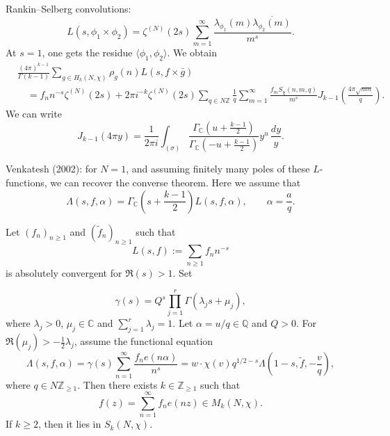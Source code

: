 \documentclass[reqno]{amsart} 
\begin{document}
Rankin--Selberg convolutions:
\begin{equation*}
  L (s, \phi_1 \times \phi_2 ) = \zeta^{(N)} (2 s )
  \sum_{m = 1 }^\infty
  \frac{\lambda_{\phi_1 } (m) \overline{\lambda_{\phi_2 } (m)}}{ m^s}.
\end{equation*}
At $s=1$, one gets the residue $\langle \phi_1, \phi_2 \rangle$.  We obtain
\begin{align*}
  &\frac{(4 \pi )^{k - 1}}{\Gamma (k - 1 )}
  \sum_{g \in H_k (N, \chi )}
  \rho_g (n) L (s, f \times \bar{g}) \\
  &\quad =
    f_n n^{- s}
    \zeta^{(N)} (2 s ) + 2 \pi i^{- k}
    \zeta^{(N)} (2 s)
    \sum_{q \in N \mathbb{Z} }
    \frac{1}{q}
    \sum_{m = 1}^\infty \frac{f_m S_\chi (n, m, q)}{m^s }
    J_{k - 1 } \left( \frac{4 \pi \sqrt{m n }}{q} \right).
\end{align*}
We can write
\begin{equation*}
  J_{k - 1 } (4 \pi y)
  = \frac{1}{2 \pi i }
  \int_{(\sigma)}
  \frac{\Gamma_{\mathbb{C} } \left( u + \frac{k - 1}{2} \right)}{
    \Gamma_{\mathbb{C} } \left( - u + \frac{k - 1}{2} \right)}
  y^{u}
  \, \frac{d y}{y}.
\end{equation*}

Venkatesh (2002): for $N = 1$, and assuming finitely many poles of these $L$-functions, we can recover the converse theorem.  Here we assume that
\begin{equation*}
  \Lambda (s, f, \alpha ) = \Gamma_{\mathbb{C} } \left( s + \frac{k - 1 }{2} \right)
  L (s, f, \alpha ),
  \qquad
  \alpha = \frac{a}{q}.
\end{equation*}

\begin{theorem}
  Let $ (f_n )_{n \geq 1}$ and $(\tilde{f}_n )_{n \geq 1}$ such that
  \begin{equation*}
L (s, f ) := \sum_{n \geq 1} f_n n^{- s}
\end{equation*}
is absolutely convergent for $\Re(s) > 1$.  Set

\begin{equation*}
\gamma(s) = Q^s \prod_{j = 1 }^r \Gamma (\lambda_j s + \mu_j ),
\end{equation*}
where $\lambda_j > 0$, $\mu_j \in \mathbb{C}$ and $\sum_{j = 1}^r \lambda_j = 1$.
Let $\alpha = u / q \in \mathbb{Q}$ and $Q > 0$.  For $\Re(\mu_j) > - \tfrac{1}{2} \lambda_j$, assume the functional equation
\begin{equation*}
  \Lambda(s,f,\alpha) = \gamma (s) \sum_{n = 1 }^\infty \frac{f_n e (n \alpha )}{ n^s }
  = w \cdot \chi (v)
  q^{1/2 - s }
  \Lambda (1 - s, \tilde{f}, - \frac{v}{q}),
\end{equation*}
where $q \in N \mathbb{Z}_{\geq 1} $.  Then there exists $k \in \mathbb{Z}_{\geq 1}$ such that
\begin{equation*}
f (z) = \sum_{n = 1 }^\infty f_n e (n z ) \in M_k (N, \chi ).
\end{equation*}
If $k \geq 2$, then it lies in $S_k(N,\chi)$.
\end{theorem}
\end{document}

